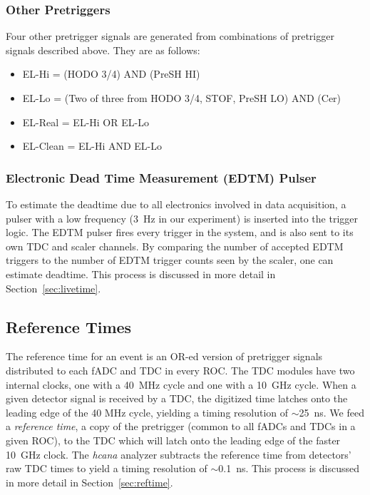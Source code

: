 \subsubsection{Other Pretriggers}
Four other pretrigger signals are generated from combinations of pretrigger
signals described above.
They are as follows:

\begin{itemize}
    \item EL-Hi = (HODO 3/4) AND (PreSH HI)
    \item EL-Lo = (Two of three from {HODO 3/4, STOF, PreSH LO}) AND (Cer)
    \item EL-Real = EL-Hi OR EL-Lo
    \item EL-Clean = EL-Hi AND EL-Lo
\end{itemize}

\subsubsection{Electronic Dead Time Measurement (EDTM) Pulser}
\label{sec:edtm}
To estimate the deadtime due to all electronics involved in data acquisition, a
pulser with a low frequency (\SI{3}{\hertz} in our experiment) is inserted into the
trigger logic.
The EDTM pulser fires every trigger in the system, and is also sent to its own
TDC and scaler channels.
By comparing the number of accepted EDTM triggers to the number of EDTM trigger
counts seen by the scaler, one can estimate deadtime.
This process is discussed in more detail in Section~\ref{sec:livetime}.

\subsection{Reference Times}
The reference time for an event is an OR-ed version of pretrigger signals
distributed to each fADC and TDC in every ROC.
The TDC modules have two internal clocks, one with a \SI{40}{MHz} cycle and one
with a \SI{10}{GHz} cycle.
When a given detector signal is received by a TDC, the digitized time latches
onto the leading edge of the 40 MHz cycle, yielding a timing resolution of
$\sim$\SI{25}{ns}.
We feed a \textit{reference time}, a copy of the pretrigger (common to all
fADCs and TDCs in a given ROC), to the TDC which will latch onto the leading
edge of the faster \SI{10}{GHz} clock.
The \textit{hcana} analyzer subtracts the reference time from detectors' raw
TDC times to yield a timing resolution of $\sim$\SI{0.1}{ns}.
This process is discussed in more detail in Section~\ref{sec:reftime}.
